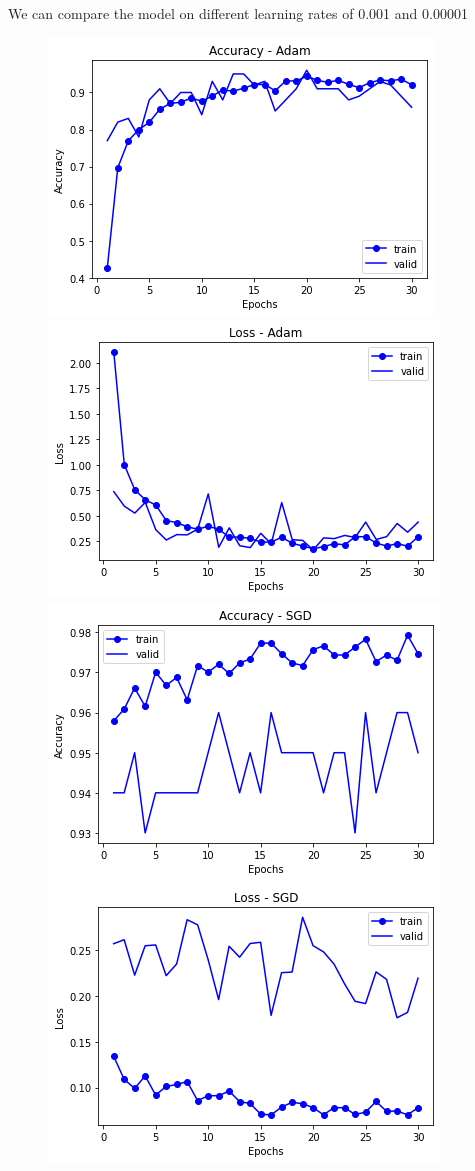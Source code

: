 We can compare the model on different learning rates of 0.001 and 0.00001
\begin{figure}[h]
\centering
\includegraphics[scale=0.40]{diagrams/vgg16/0.001lr_graphs/Adam_acc.png}
\includegraphics[scale=0.40]{diagrams/vgg16/0.001lr_graphs/Adam_loss.png}
\includegraphics[scale=0.40]{diagrams/vgg16/0.001lr_graphs/SGD_acc.png}
\includegraphics[scale=0.40]{diagrams/vgg16/0.001lr_graphs/SGD_loss.png}

\end{figure}
